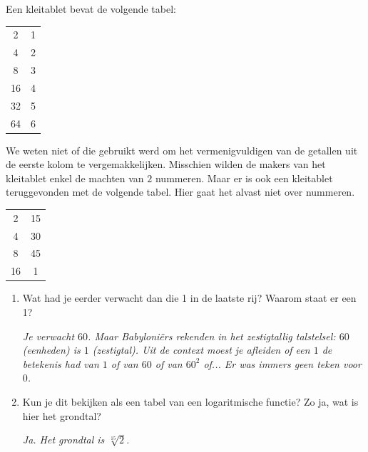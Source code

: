 
Een kleitablet bevat de volgende tabel:
\begin{center}
\begin{tabular} {| c | c |}
\hline
2 & 1\\
4 & 2\\
8 & 3\\
16 & 4\\
32 & 5 \\
64 & 6\\
\hline
\end{tabular}
\end{center}
We weten niet of die gebruikt werd om het vermenigvuldigen van de getallen uit de eerste kolom te vergemakkelijken. Misschien wilden de makers van het kleitablet enkel de machten van $2$ nummeren. Maar er is ook een kleitablet teruggevonden met de volgende tabel. Hier gaat het alvast niet over nummeren.

\begin{center}
\begin{tabular} {| c | c |}
\hline
2 & 15\\
4 & 30\\
8 & 45\\
16 & 1\\
\hline
\end{tabular}
\end{center}

\begin{enumerate}
    \item Wat had je eerder verwacht dan die 1 in de laatste rij? Waarom staat er een 1?
    
\emph{Je verwacht $60$. Maar Babyloniërs rekenden in het zestigtallig talstelsel: $60$ (eenheden) is $1$ (zestigtal). Uit de context moest je afleiden of een $1$ de betekenis had van $1$ of van $60$ of van $60^2$ of... Er was immers geen teken voor $0$.}

\item Kun je dit bekijken als een tabel van een logaritmische functie? Zo ja, wat is hier het grondtal?

\emph{Ja. Het grondtal is $\sqrt[15]{2}$.}
\end{enumerate}


\eindewerktekst

